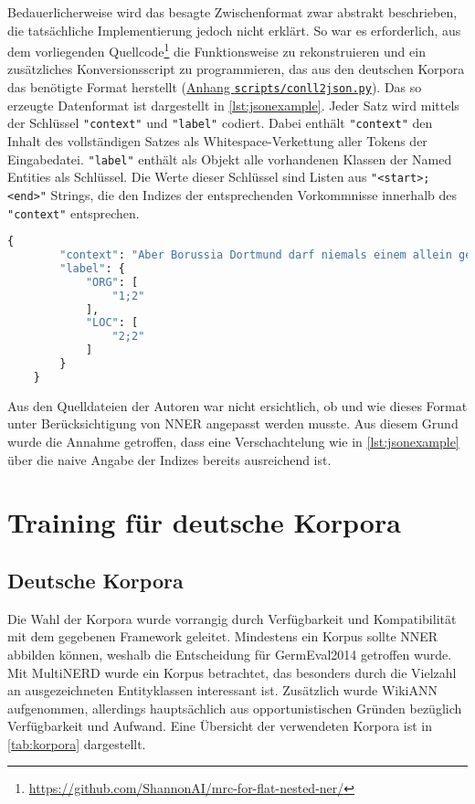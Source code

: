Bedauerlicherweise wird das besagte Zwischenformat zwar abstrakt beschrieben, die tatsächliche Implementierung jedoch nicht erklärt. So war es erforderlich, aus dem vorliegenden Quellcode\footnote{\url{https://github.com/ShannonAI/mrc-for-flat-nested-ner/}} die Funktionsweise zu rekonstruieren und ein zusätzliches Konversionsscript zu programmieren, das aus den deutschen Korpora das benötigte Format herstellt (\hyperref[app:conll2json]{Anhang \texttt{scripts/conll2json.py}}). Das so erzeugte Datenformat ist dargestellt in \autoref{lst:jsonexample}. Jeder Satz wird mittels der Schlüssel \verb|"context"| und \verb|"label"| codiert. Dabei enthält \verb|"context"| den Inhalt des vollständigen Satzes als Whitespace-Verkettung aller Tokens der Eingabedatei. \verb|"label"| enthält als Objekt alle vorhandenen Klassen der Named Entities als Schlüssel. Die Werte dieser Schlüssel sind Listen aus \verb|"<start>;<end>"| Strings, die den Indizes der entsprechenden Vorkommnisse innerhalb des \verb|"context"| entsprechen.

\begin{lstlisting}[caption={Beispiel aus GermEval2014 für das erforderliche JSON-Format}, language={Python}, label={lst:jsonexample}]
	{
		"context": "Aber Borussia Dortmund darf niemals einem allein gehören .",
		"label": {
			"ORG": [
				"1;2"
			],
			"LOC": [
				"2;2"
			]
		}
	}
\end{lstlisting}

Aus den Quelldateien der Autoren war nicht ersichtlich, ob und wie dieses Format unter Berücksichtigung von NNER angepasst werden musste. Aus diesem Grund wurde die Annahme getroffen, dass eine Verschachtelung wie in \autoref{lst:jsonexample} über die naive Angabe der Indizes bereits ausreichend ist.

\chapter{Training für deutsche Korpora}
\label{ch:Training}

\section{Deutsche Korpora}
\label{ch:Training:sec:Deutsche_Korpora}

Die Wahl der Korpora wurde vorrangig durch Verfügbarkeit und Kompatibilität mit dem gegebenen Framework geleitet. Mindestens ein Korpus sollte NNER abbilden können, weshalb die Entscheidung für GermEval2014 \parencite{germeval2014} getroffen wurde. Mit MultiNERD \parencite{multinerd} wurde ein Korpus betrachtet, das besonders durch die Vielzahl an ausgezeichneten Entityklassen interessant ist. Zusätzlich wurde WikiANN \parencite{wikiann} aufgenommen, allerdings hauptsächlich aus opportunistischen Gründen bezüglich Verfügbarkeit und Aufwand. Eine Übersicht der verwendeten Korpora ist in \autoref{tab:korpora} dargestellt.

